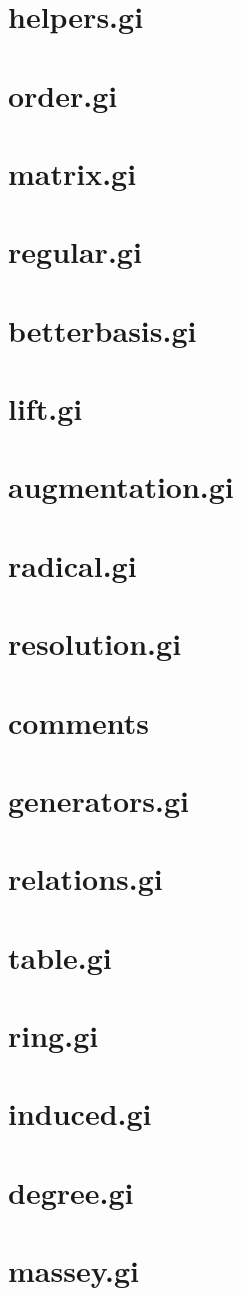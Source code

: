 \documentclass[12pt]{article}
\begin{document}
\section{helpers.gi}
\section{order.gi}
\section{matrix.gi}
\section{regular.gi}
\section{betterbasis.gi}
\section{lift.gi}
\section{augmentation.gi}
\section{radical.gi}

\section{resolution.gi}
\section{comments}
\section{generators.gi}
\section{relations.gi}

\section{table.gi}
\section{ring.gi}
\section{induced.gi}
\section{degree.gi}
\section{massey.gi}
\end{document}
